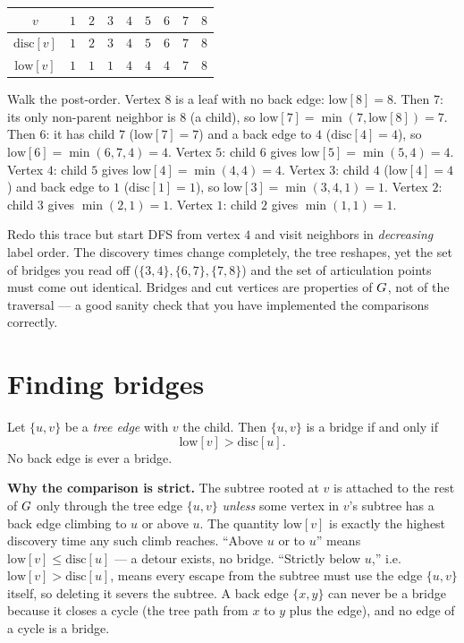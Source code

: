 \begin{center}
\begin{tabular}{c|cccccccc}
\toprule
$v$            & $1$ & $2$ & $3$ & $4$ & $5$ & $6$ & $7$ & $8$\\
\midrule
$\mathrm{disc}[v]$ & $1$ & $2$ & $3$ & $4$ & $5$ & $6$ & $7$ & $8$\\
$\mathrm{low}[v]$  & $1$ & $1$ & $1$ & $4$ & $4$ & $4$ & $7$ & $8$\\
\bottomrule
\end{tabular}
\end{center}

Walk the post-order. Vertex $8$ is a leaf with no back edge: $\mathrm{low}[8]=8$. Then
$7$: its only non-parent neighbor is $8$ (a child), so $\mathrm{low}[7]=\min(7,
\mathrm{low}[8])=7$. Then $6$: it has child $7$ ($\mathrm{low}[7]=7$) and a back edge to
$4$ ($\mathrm{disc}[4]=4$), so $\mathrm{low}[6]=\min(6,7,4)=4$. Vertex $5$: child $6$ gives
$\mathrm{low}[5]=\min(5,4)=4$. Vertex $4$: child $5$ gives $\mathrm{low}[4]=\min(4,4)=4$.
Vertex $3$: child $4$ ($\mathrm{low}[4]=4$) and back edge to $1$ ($\mathrm{disc}[1]=1$),
so $\mathrm{low}[3]=\min(3,4,1)=1$. Vertex $2$: child $3$ gives $\min(2,1)=1$. Vertex
$1$: child $2$ gives $\min(1,1)=1$.

\begin{labbox}
Redo this trace but start DFS from vertex $4$ and visit neighbors in \emph{decreasing}
label order. The discovery times change completely, the tree reshapes, yet the set of
bridges you read off ($\{3,4\},\{6,7\},\{7,8\}$) and the set of articulation points
must come out identical. Bridges and cut vertices are properties of $G$, not of the
traversal --- a good sanity check that you have implemented the comparisons correctly.
\end{labbox}

\section{Finding bridges}
\label{ch10:bridges}

\begin{theorem}
\label{ch10:thm-bridge}
Let $\{u,v\}$ be a \emph{tree edge} with $v$ the child. Then $\{u,v\}$ is a bridge if
and only if
\[
  \mathrm{low}[v] > \mathrm{disc}[u].
\]
No back edge is ever a bridge.
\end{theorem}

\begin{whybox}
\textbf{Why the comparison is strict.} The subtree rooted at $v$ is attached to the
rest of $G$ only through the tree edge $\{u,v\}$ \emph{unless} some vertex in $v$'s
subtree has a back edge climbing to $u$ or above $u$. The quantity $\mathrm{low}[v]$ is
exactly the highest discovery time any such climb reaches. ``Above $u$ or to $u$''
means $\mathrm{low}[v]\le\mathrm{disc}[u]$ --- a detour exists, no bridge. ``Strictly
below $u$,'' i.e.\ $\mathrm{low}[v]>\mathrm{disc}[u]$, means every escape from the
subtree must use the edge $\{u,v\}$ itself, so deleting it severs the subtree. A back
edge $\{x,y\}$ can never be a bridge because it closes a cycle (the tree path from $x$
to $y$ plus the edge), and no edge of a cycle is a bridge.
\end{whybox}

